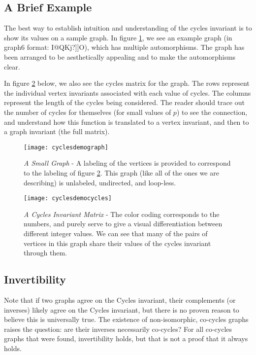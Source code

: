 \subsection{A Brief Example}

The best way to establish intuition and understanding of the cycles invariant is to show its values on a sample graph.
In figure \ref{fig:cyclesdemograph}, we see an example graph (in graph6 format: I@QKj?]]O), which has multiple automorphisms.
The graph has been arranged to be aesthetically appealing and to make the automorphisms clear.

In figure \ref{fig:cyclesdemocycles} below, we also see the cycles matrix for the graph.
The rows represent the individual vertex invariants associated with each value of cycles.
The columns represent the length of the cycles being considered.
The reader should trace out the number of cycles for themselves (for small values of $p$) to see the connection, and understand how this function is translated to a vertex invariant, and then to a graph invariant (the full matrix).

\begin{figure}[h]
\label{fig:cyclesdemograph}
\caption{\emph{A Small Graph} - A labeling of the vertices is provided to correspond to the labeling of figure \ref{fig:cyclesdemocycles}. This graph (like all of the ones we are describing) is unlabeled, undirected, and loop-less.}
\centering
\texttt{[image: cyclesdemograph]}
\end{figure}

\begin{figure}[h]
\label{fig:cyclesdemocycles}
\caption{\emph{A Cycles Invariant Matrix} - The color coding corresponds to the numbers, and purely serve to give a visual differentiation between different integer values.  We can see that many of the pairs of vertices in this graph share their values of the cycles invariant through them.}
\centering
\texttt{[image: cyclesdemocycles]}
\end{figure}

\subsection{Invertibility}
Note that if two graphs agree on the Cycles invariant, their complements (or inverses) likely agree on the Cycles invariant, but there is no proven reason to believe this is universally true.
The existence of non-isomorphic, co-cycles graphs raises the question: are their inverses necessarily co-cycles?
For all co-cycles graphs that were found, invertibility holds, but that is not a proof that it always holds.


